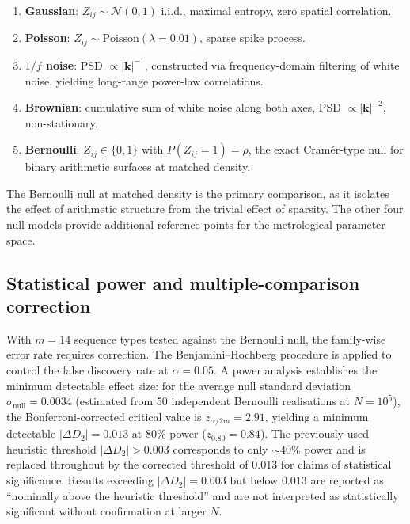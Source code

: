 \documentclass[final,3p,times,twocolumn]{elsarticle}
\theoremstyle{definition}
\begin{document}
\begin{enumerate}
  \item \textbf{Gaussian}: $Z_{ij} \sim \mathcal{N}(0,1)$ i.i.d.,
        maximal entropy, zero spatial correlation.
  \item \textbf{Poisson}: $Z_{ij} \sim \text{Poisson}(\lambda = 0.01)$,
        sparse spike process.
  \item \textbf{$1/f$ noise}: PSD $\propto |\mathbf{k}|^{-1}$,
        constructed via frequency-domain filtering of white noise,
        yielding long-range power-law correlations.
  \item \textbf{Brownian}: cumulative sum of white noise along both
        axes, PSD $\propto |\mathbf{k}|^{-2}$, non-stationary.
  \item \textbf{Bernoulli}: $Z_{ij} \in \{0,1\}$ with
        $P(Z_{ij}=1) = \rho$, the exact Cram\'er-type null for binary
        arithmetic surfaces at matched density.
\end{enumerate}

The Bernoulli null at matched density is the primary comparison, as it
isolates the effect of arithmetic structure from the trivial effect of
sparsity. The other four null models provide additional reference points
for the metrological parameter space.


\subsection{Statistical power and multiple-comparison correction}

With $m=14$ sequence types tested against the Bernoulli null, the
family-wise error rate requires correction. The Benjamini--Hochberg
procedure is applied to control the false discovery rate at
$\alpha = 0.05$. A power analysis establishes the minimum detectable
effect size: for the average null standard deviation
$\sigma_{\text{null}} = 0.0034$ (estimated from 50 independent
Bernoulli realisations at $N=10^5$), the Bonferroni-corrected
critical value is $z_{\alpha/2m} = 2.91$, yielding a minimum
detectable $|\Delta D_2| = 0.013$ at 80\% power
($z_{0.80} = 0.84$). The previously used heuristic threshold
$|\Delta D_2| > 0.003$ corresponds to only $\sim 40\%$ power and
is replaced throughout by the corrected threshold of $0.013$ for
claims of statistical significance. Results exceeding
$|\Delta D_2| = 0.003$ but below $0.013$ are reported as
``nominally above the heuristic threshold'' and are not interpreted
as statistically significant without confirmation at larger $N$.
\end{document}
